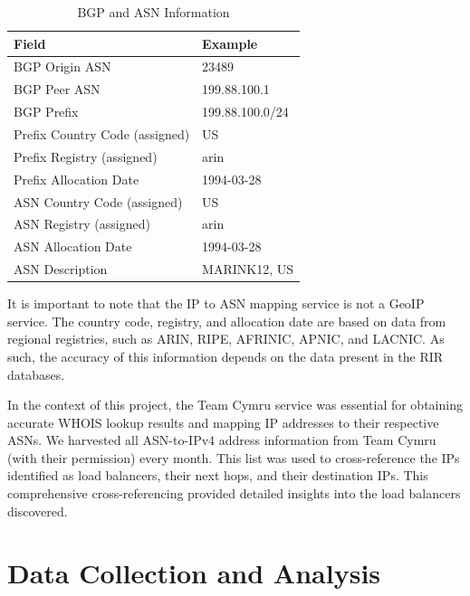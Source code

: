 \documentclass[12pt]{cwru_thesis}
\begin{document}
\begin{table}[h]
    \centering
    \begin{tabular}{|l|l|}
        \hline
        \textbf{Field} & \textbf{Example} \\
        \hline
        BGP Origin ASN & 23489 \\
        \hline
        BGP Peer ASN & 199.88.100.1 \\
        \hline
        BGP Prefix & 199.88.100.0/24 \\
        \hline
        Prefix Country Code (assigned) & US \\
        \hline
        Prefix Registry (assigned) & arin \\
        \hline
        Prefix Allocation Date & 1994-03-28 \\
        \hline
        ASN Country Code (assigned) & US \\
        \hline
        ASN Registry (assigned) & arin \\
        \hline
        ASN Allocation Date & 1994-03-28 \\
        \hline
        ASN Description & MARINK12, US \\
        \hline
    \end{tabular}
    \caption{BGP and ASN Information}
    \label{tab:bgp_asn_info}
\end{table}

It is important to note that the IP to ASN mapping service is not a GeoIP service. The country code, registry, and allocation date are based on data from regional registries, such as ARIN, RIPE, AFRINIC, APNIC, and LACNIC. As such, the accuracy of this information depends on the data present in the RIR databases.

In the context of this project, the Team Cymru service was essential for obtaining accurate WHOIS lookup results and mapping IP addresses to their respective ASNs. We harvested all ASN-to-IPv4 address information from Team Cymru (with their permission) every month. This list was used to cross-reference the IPs identified as load balancers, their next hops, and their destination IPs. This comprehensive cross-referencing provided detailed insights into the load balancers discovered.





\chapter{Data Collection and Analysis}
\end{document}
